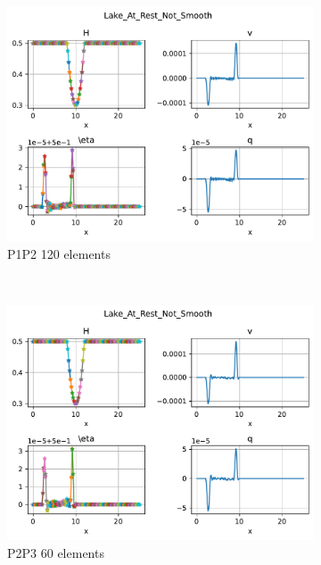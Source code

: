 \documentclass[english]{article}
\theoremstyle{thmstyleone}
\theoremstyle{thmstyletwo}
\theoremstyle{thmstylethree}
\begin{document}
\begin{figure}
\begin{subfigure}{0.40\textwidth}
	\end{subfigure}\\
	\begin{subfigure}{0.60\textwidth}
		\includegraphics[trim= 0 0 0 180, clip,width=\textwidth]{figures/LatRnS_P1P2_N_el00120.pdf}\caption{P1P2 120 elements}
	\end{subfigure}\\
	\begin{subfigure}{0.60\textwidth}
		\includegraphics[trim= 0 0 0 180, clip,width=\textwidth]{figures/LatRnS_P2P3_N_el00060.pdf}\caption{P2P3 60 elements}
	\end{subfigure}\\
	\begin{subfigure}{0.60\textwidth}

\end{subfigure}
\end{figure}
\end{document}
